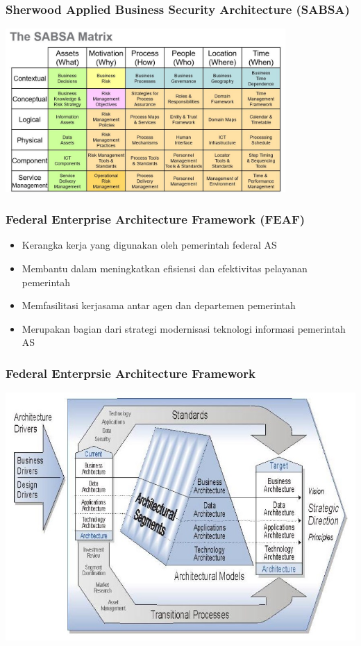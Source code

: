 \documentclass[aspectratio=169, table]{beamer}
\begin{document}
	{
		\begin{frame}
			\frametitle{Sherwood Applied Business Security Architecture (SABSA)}
			\begin{center}
				\includegraphics[width=0.8\textwidth]{../figures/sabsa}
			\end{center}
		\end{frame}
	}
	
	
	\begin{frame}
		\frametitle{Federal Enterprise Architecture Framework (FEAF)}
		\begin{itemize}
			\item Kerangka kerja yang digunakan oleh pemerintah federal AS
			\item Membantu dalam meningkatkan efisiensi dan efektivitas pelayanan pemerintah
			\item Memfasilitasi kerjasama antar agen dan departemen pemerintah
			\item Merupakan bagian dari strategi modernisasi teknologi informasi pemerintah AS
		\end{itemize}
	\end{frame}
	
	{
		\begin{frame}
			\frametitle{Federal Enterprsie Architecture Framework}
			\begin{center}
				\includegraphics[width=.65\textwidth]{../figures/feaf}
			\end{center}
		\end{frame}
	}
	
\end{document}

